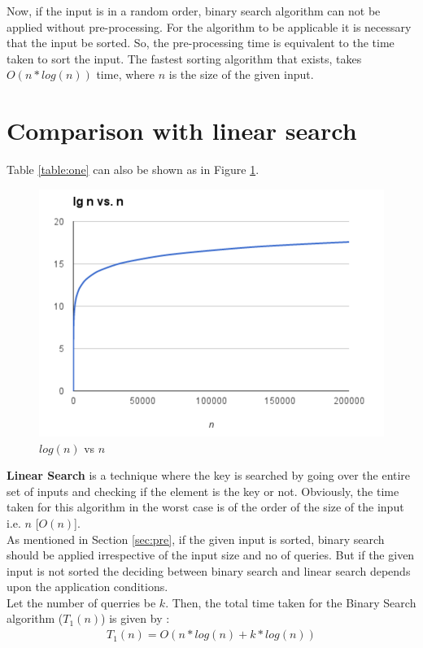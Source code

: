 \documentclass{article}
\begin{document}
Now, if the input is in a random order, binary search algorithm can not be applied without pre-processing.
For the algorithm to be applicable it is necessary that the input be sorted. So, the pre-processing time is equivalent to the time taken to sort the input.
The fastest sorting algorithm that exists, takes $O(n*log(n))$ time, where $n$ is the size of the given input.

\section{Comparison with linear search}

Table \ref{table:one} can also be shown as in Figure \ref{fig:two}. \\

\begin{figure}[h!]
\begin{center}
\includegraphics[width=0.47\columnwidth]{three.jpg}
\caption{ $log(n)$ vs $n$ }
\label{fig:two}
\end{center}
\end{figure}

\textbf{Linear Search} is a technique where the key is searched by going over the entire set of inputs and checking if the element is the key or not.
Obviously, the time taken for this algorithm in the worst case is of the order of the size of the input i.e. $n$ [$O(n)$].  \\

As mentioned in Section \ref{sec:pre}, if the given input is sorted, binary search should be applied irrespective of the input size and no of queries.
But if the given input is not sorted the deciding between binary search and linear search depends upon the application conditions.\\

Let the number of querries be $k$. Then, the total time taken for the Binary Search algorithm ($T_1(n)$) is given by :
\begin{align}
T_1(n) = O(n*log(n) + k*log(n))
\label{eq:bin2}
\end{align}
\end{document}
